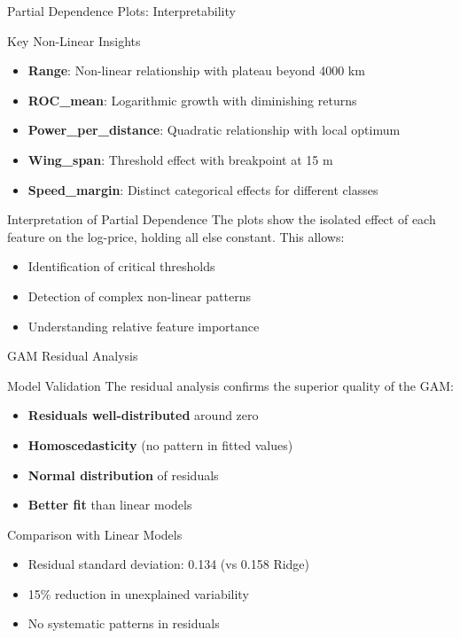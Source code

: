 \documentclass{beamer}
\begin{document}
\begin{frame}{Partial Dependence Plots: Interpretability}
    \begin{block}{Key Non-Linear Insights}
        \begin{itemize}
            \item \textbf{Range}: Non-linear relationship with plateau beyond 4000 km
            \item \textbf{ROC\_mean}: Logarithmic growth with diminishing returns
            \item \textbf{Power\_per\_distance}: Quadratic relationship with local optimum
            \item \textbf{Wing\_span}: Threshold effect with breakpoint at 15 m
            \item \textbf{Speed\_margin}: Distinct categorical effects for different classes
        \end{itemize}
    \end{block}
    
    \begin{block}{Interpretation of Partial Dependence}
        The plots show the isolated effect of each feature on the log-price, holding all else constant. This allows:
        \begin{itemize}
            \item Identification of critical thresholds
            \item Detection of complex non-linear patterns
            \item Understanding relative feature importance
        \end{itemize}
    \end{block}
\end{frame}

\begin{frame}{GAM Residual Analysis}
    \begin{block}{Model Validation}
        The residual analysis confirms the superior quality of the GAM:
        \begin{itemize}
            \item \textbf{Residuals well-distributed} around zero
            \item \textbf{Homoscedasticity} (no pattern in fitted values)
            \item \textbf{Normal distribution} of residuals
            \item \textbf{Better fit} than linear models
        \end{itemize}
    \end{block}
    
    \begin{block}{Comparison with Linear Models}
        \begin{itemize}
            \item Residual standard deviation: 0.134 (vs 0.158 Ridge)
            \item 15\% reduction in unexplained variability
            \item No systematic patterns in residuals
        \end{itemize}
    \end{block}
\end{frame}
\end{document}

